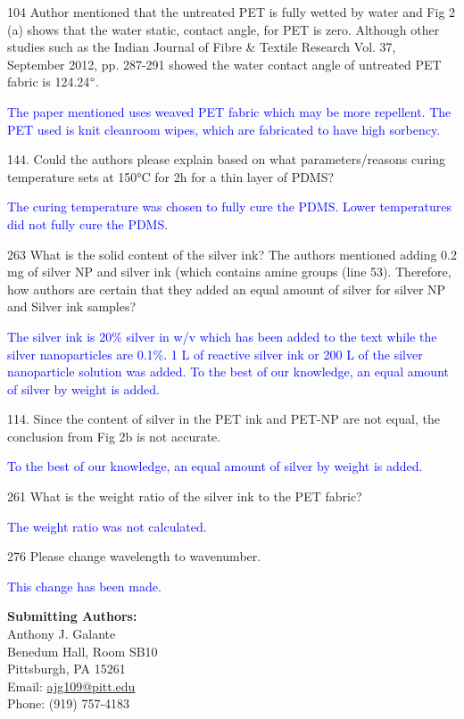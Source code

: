 \documentclass[12pt]{letter}
\newcommand{\blue}[1]{\textcolor{blue}{#1}} %
\begin{document}
104 Author mentioned that the untreated PET is fully wetted by water and Fig 2 (a) shows that the water static, contact angle, for PET is zero. Although other studies such as the Indian Journal of Fibre \& Textile Research Vol. 37, September 2012, pp. 287-291 showed the water contact angle of untreated PET fabric is 124.24$\degree$.

\blue{The paper mentioned uses weaved PET fabric which may be more repellent. The PET used is knit cleanroom wipes, which are fabricated to have high sorbency. }

144. Could the authors please explain based on what parameters/reasons curing temperature sets at 150°C for 2h for a thin layer of PDMS?

\blue{The curing temperature was chosen to fully cure the PDMS. Lower temperatures did not fully cure the PDMS. }

263 What is the solid content of the silver ink?
The authors mentioned adding 0.2 mg of silver NP and silver ink (which contains amine groups (line 53). Therefore, how authors are certain that they added an equal amount of silver for silver NP and Silver ink samples?

\blue{The silver ink is 20\% silver in w/v which has been added to the text while the silver nanoparticles are 0.1\%. 1 \micro L of reactive silver ink or 200 \micro L of the silver nanoparticle solution was added. To the best of our knowledge, an equal amount of silver by weight is added. }

114. Since the content of silver in the PET ink and PET-NP are not equal, the conclusion from Fig 2b is not accurate.

\blue{To the best of our knowledge, an equal amount of silver by weight is added.}

261 What is the weight ratio of the silver ink to the PET fabric?

\blue{The weight ratio was not calculated. }

276 Please change wavelength to wavenumber.

\blue{This change has been made. }

\newpage


\textbf{Submitting Authors:}\\
Anthony J. Galante\\
Benedum Hall, Room SB10 \\
Pittsburgh, PA 15261\\
Email:  \href{mailto:ajg109@pitt.edu}{ajg109@pitt.edu}\\
Phone: (919) 757-4183\\
\end{document}

